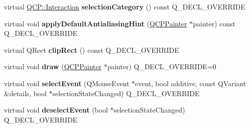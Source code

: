 \begin{DoxyCompactItemize}
\item 
virtual \hyperlink{namespace_q_c_p_a2ad6bb6281c7c2d593d4277b44c2b037}{Q\+C\+P\+::\+Interaction} {\bfseries selection\+Category} () const Q\+\_\+\+D\+E\+C\+L\+\_\+\+O\+V\+E\+R\+R\+I\+DE\hypertarget{class_q_c_p_abstract_legend_item_ab5ab91a008b5528140bd523519a50322}{}\label{class_q_c_p_abstract_legend_item_ab5ab91a008b5528140bd523519a50322}

\item 
virtual void {\bfseries apply\+Default\+Antialiasing\+Hint} (\hyperlink{class_q_c_p_painter}{Q\+C\+P\+Painter} $\ast$painter) const Q\+\_\+\+D\+E\+C\+L\+\_\+\+O\+V\+E\+R\+R\+I\+DE\hypertarget{class_q_c_p_abstract_legend_item_a219f23e13a943835f93f66508b04076f}{}\label{class_q_c_p_abstract_legend_item_a219f23e13a943835f93f66508b04076f}

\item 
virtual Q\+Rect {\bfseries clip\+Rect} () const Q\+\_\+\+D\+E\+C\+L\+\_\+\+O\+V\+E\+R\+R\+I\+DE\hypertarget{class_q_c_p_abstract_legend_item_ac3f4d8f9c177a93205a8934e17b18344}{}\label{class_q_c_p_abstract_legend_item_ac3f4d8f9c177a93205a8934e17b18344}

\item 
virtual void {\bfseries draw} (\hyperlink{class_q_c_p_painter}{Q\+C\+P\+Painter} $\ast$painter) Q\+\_\+\+D\+E\+C\+L\+\_\+\+O\+V\+E\+R\+R\+I\+DE=0\hypertarget{class_q_c_p_abstract_legend_item_a14ce0b09f5b814c765a0d790bd838909}{}\label{class_q_c_p_abstract_legend_item_a14ce0b09f5b814c765a0d790bd838909}

\item 
virtual void {\bfseries select\+Event} (Q\+Mouse\+Event $\ast$event, bool additive, const Q\+Variant \&details, bool $\ast$selection\+State\+Changed) Q\+\_\+\+D\+E\+C\+L\+\_\+\+O\+V\+E\+R\+R\+I\+DE\hypertarget{class_q_c_p_abstract_legend_item_a3f8b6d953adee75c9702603dd236f764}{}\label{class_q_c_p_abstract_legend_item_a3f8b6d953adee75c9702603dd236f764}

\item 
virtual void {\bfseries deselect\+Event} (bool $\ast$selection\+State\+Changed) Q\+\_\+\+D\+E\+C\+L\+\_\+\+O\+V\+E\+R\+R\+I\+DE\hypertarget{class_q_c_p_abstract_legend_item_a92c17b47da59f37e8ef5a22a95e9a5d0}{}\label{class_q_c_p_abstract_legend_item_a92c17b47da59f37e8ef5a22a95e9a5d0}

\end{DoxyCompactItemize}

